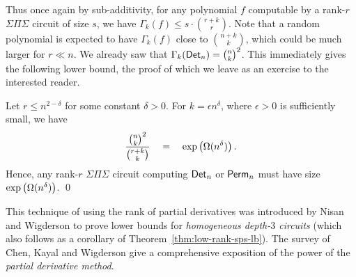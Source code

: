 Thus once again by sub-additivity, for any polynomial $f$ computable by a rank-$r$ $\Sigma\Pi\Sigma$ circuit of size $s$, we have $\Gamma_k(f) \leq s\cdot \binom{r+k}{r}$. Note that a random polynomial is expected to have $\Gamma_k(f)$ close to $\binom{n+k}{k}$, which could be much larger for $r\ll n$. We already saw that $\Gamma_k(\mathsf{Det}_n) = \binom{n}{k}^2$. This immediately gives the following lower bound, the proof of which we leave as an exercise to the interested reader. 

\begin{theorem}\label{thm:low-rank-sps-lb}
Let $r \leq n^{2-\delta}$ for some constant $\delta > 0$. For $k = \epsilon n^{\delta}$, where $\epsilon > 0$ is sufficiently small, we have
$$
\frac{\binom{n}{k}^2}{\binom{r+k}{k}} \quad=\quad \exp\left(\Omega(n^{\delta})\right).
$$
Hence, any rank-$r$ $\Sigma\Pi\Sigma$ circuit computing $\mathsf{Det}_n$ or $\mathsf{Perm}_n$ must have size $\exp\left(\Omega(n^\delta)\right)$. \qed
\end{theorem}


This technique of using the rank of partial derivatives was introduced by Nisan and Wigderson \cite{nw1997} to prove lower bounds for \emph{homogeneous depth-$3$ circuits} (which also follows as a corollary of Theorem~\ref{thm:low-rank-sps-lb}). The survey of Chen, Kayal and Wigderson \cite{ckw11} give a comprehensive exposition of the power of the \emph{partial derivative method}. \\



